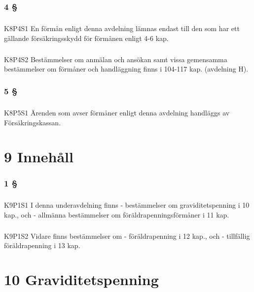 \documentclass[a4paper,notitlepage,openany,10pt]{book}
\begin{document}
\subsection*{4 §}
\paragraph*{}
{\tiny K8P4S1}
En förmån enligt denna avdelning lämnas endast till den som har ett gällande försäkringsskydd för förmånen enligt 4-6 kap.
\paragraph*{}
{\tiny K8P4S2}
Bestämmelser om anmälan och ansökan samt vissa gemensamma bestämmelser om förmåner och handläggning finns i 104-117 kap. (avdelning H).
\subsection*{5 §}
\paragraph*{}
{\tiny K8P5S1}
Ärenden som avser förmåner enligt denna avdelning handläggs av Försäkringskassan.
\chapter*{9 Innehåll}
\subsection*{1 §}
\paragraph*{}
{\tiny K9P1S1}
I denna underavdelning finns
\newline - bestämmelser om graviditetspenning i 10 kap., och
\newline - allmänna bestämmelser om föräldrapenningsförmåner i 11 kap.
\paragraph*{}
{\tiny K9P1S2}
Vidare finns bestämmelser om
\newline - föräldrapenning i 12 kap., och
\newline - tillfällig föräldrapenning i 13 kap.
\chapter*{10 Graviditetspenning}
\end{document}
